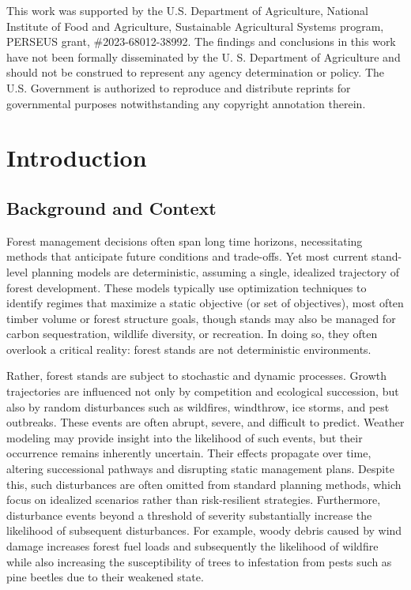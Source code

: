\documentclass[12pt]{report}
\begin{document}
{}
This work was supported by the U.S. Department of Agriculture, National Institute of Food and Agriculture, Sustainable Agricultural Systems program, PERSEUS grant, {\#}2023-68012-38992. The findings and conclusions in this work have not been formally disseminated by the U. S. Department of Agriculture and should not be construed to represent any agency determination or policy. The U.S. Government is authorized to reproduce and distribute reprints for governmental purposes notwithstanding any copyright annotation therein.

\tableofcontents

\listoffigures   %
\listoftables    %

\newpage
{}  %

\chapter{Introduction}
\section{Background and Context}
Forest management decisions often span long time horizons, necessitating methods that anticipate future conditions and trade-offs. Yet most current stand-level planning models are deterministic, assuming a single, idealized trajectory of forest development. These models typically use optimization techniques to identify regimes that maximize a static objective (or set of objectives), most often timber volume or forest structure goals, though stands may also be managed for carbon sequestration, wildlife diversity, or recreation. In doing so, they often overlook a critical reality: forest stands are not deterministic environments.

Rather, forest stands are subject to stochastic and dynamic processes. Growth trajectories are influenced not only by competition and ecological succession, but also by random disturbances such as wildfires, windthrow, ice storms, and pest outbreaks. These events are often abrupt, severe, and difficult to predict. Weather modeling may provide insight into the likelihood of such events, but their occurrence remains inherently uncertain. Their effects propagate over time, altering successional pathways and disrupting static management plans. Despite this, such disturbances are often omitted from standard planning methods, which focus on idealized scenarios rather than risk-resilient strategies. Furthermore, disturbance events beyond a threshold of severity substantially increase the likelihood of subsequent disturbances. For example, woody debris caused by wind damage increases forest fuel loads and subsequently the likelihood of wildfire while also increasing the susceptibility of trees to infestation from pests such as pine beetles due to their weakened state.
\end{document}
